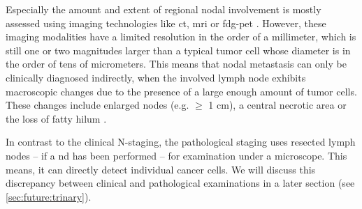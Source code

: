 \documentclass[\relativeRoot/main.tex]{subfiles}
\begin{document}
Especially the amount and extent of regional nodal involvement is mostly assessed using imaging technologies like \gls{ct}, \gls{mri} or \gls{fdg-pet} \cite{johnson_head_2020,van_den_bosch_18f-fdg-petct-based_2020}. However, these imaging modalities have a limited resolution in the order of a millimeter, which is still one or two magnitudes larger than a typical tumor cell whose diameter is in the order of tens of micrometers. This means that nodal metastasis can only be clinically diagnosed indirectly, when the involved lymph node exhibits macroscopic changes due to the presence of a large enough amount of tumor cells. These changes include enlarged nodes (e.g. $\geq$ 1 cm), a central necrotic area or the loss of fatty hilum \cite{pillsbury_iii_rationale_1997,biau_selection_2019,ludwig_dataset_2021}.

In contrast to the clinical N-staging, the pathological staging uses resected lymph nodes -- if a \acrlong{nd} has been performed -- for examination under a microscope. This means, it can directly detect individual cancer cells. We will discuss this discrepancy between clinical and pathological examinations in a later section (see \cref{sec:future:trinary}).
\end{document}
